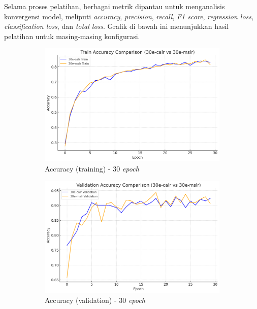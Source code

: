 Selama proses pelatihan, berbagai metrik dipantau untuk menganalisis konvergensi model, meliputi \emph{accuracy}, \emph{precision}, \emph{recall}, \emph{F1 score}, \emph{regression loss}, \emph{classification loss}, dan \emph{total loss}. Grafik di bawah ini menunjukkan hasil pelatihan untuk masing-masing konfigurasi.

\begin{figure}[htbp]
  \centering
  \begin{subfigure}{0.45\textwidth}
    \includegraphics[width=\textwidth]{gambar/bab4-train-acc-30e.png}
    \caption{Accuracy (training) - 30 \emph{epoch}}
  \end{subfigure}
  \hfill
  \begin{subfigure}{0.45\textwidth}
    \includegraphics[width=\textwidth]{gambar/bab4-val-acc-30e.png}
    \caption{Accuracy (validation) - 30 \emph{epoch}}
  \end{subfigure}
  \begin{subfigure}{0.45\textwidth}

\end{subfigure}
\end{figure}
